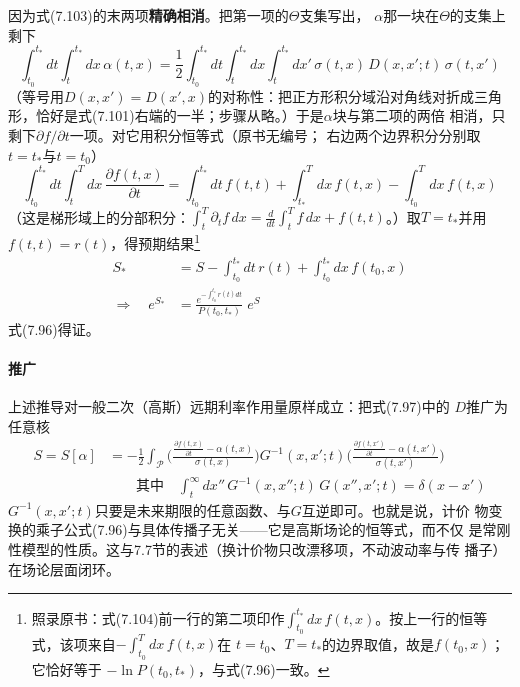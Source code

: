 因为式(7.103)的末两项\textbf{精确相消}。把第一项的$\Theta$支集写出，
$\alpha$那一块在$\Theta$的支集上剩下
\begin{equation*}
\int_{t_{0}}^{t_{*}}dt\int_{t}^{t_{*}}dx\,\alpha(t,x)
=\frac{1}{2}\int_{t_{0}}^{t_{*}}dt\int_{t}^{t_{*}}dx
\int_{t}^{t_{*}}dx'\,\sigma(t,x)\,D(x,x';t)\,\sigma(t,x')
\end{equation*}
（等号用$D(x,x')=D(x',x)$的对称性：把正方形积分域沿对角线对折成三角
形，恰好是式(7.101)右端的一半；步骤从略。）于是$\alpha$块与第二项的两倍
相消，只剩下$\partial f/\partial t$一项。对它用积分恒等式（原书无编号；
右边两个边界积分分别取$t=t_{*}$与$t=t_{0}$）
\begin{equation*}
\int_{t_{0}}^{t_{*}}dt\int_{t}^{T}dx\,\frac{\partial f(t,x)}{\partial t}
=\int_{t_{0}}^{t_{*}}dt\,f(t,t)+\int_{t_{*}}^{T}dx\,f(t,x)
-\int_{t_{0}}^{T}dx\,f(t,x)
\end{equation*}
（这是梯形域上的分部积分：$\int_{t}^{T}\partial_{t}f\,dx=\frac{d}{dt}
\int_{t}^{T}f\,dx+f(t,t)$。）取$T=t_{*}$并用$f(t,t)=r(t)$，得预期结果\footnote{照录原书：式(7.104)前一行的第二项印作$\int_{t_{0}}^{t_{*}}dx\,
f(t,x)$。按上一行的恒等式，该项来自$-\int_{t_{0}}^{T}dx\,f(t,x)$在
$t=t_{0}$、$T=t_{*}$的边界取值，故是$f(t_{0},x)$；它恰好等于
$-\ln P(t_{0},t_{*})$，与式(7.96)一致。}
\begin{align*}
S_{*}&=S-\int_{t_{0}}^{t_{*}}dt\,r(t)+\int_{t_{0}}^{t_{*}}dx\,f(t_{0},x)\\
\Rightarrow\quad e^{S_{*}}&=\frac{e^{-\int_{t_{0}}^{t_{*}}r(t)dt}}
{P(t_{0},t_{*})}\;e^{S}
\tag{7.104}
\end{align*}式(7.96)得证。

\paragraph{推广}
上述推导对一般二次（高斯）远期利率作用量原样成立：把式(7.97)中的
$D$推广为任意核
\begin{align*}
S=S[\alpha]&=-\frac{1}{2}\int_{\mathcal{P}}
\biggl(\frac{\frac{\partial f(t,x)}{\partial t}-\alpha(t,x)}{\sigma(t,x)}
\biggr)G^{-1}(x,x';t)
\biggl(\frac{\frac{\partial f(t,x')}{\partial t}-\alpha(t,x')}{\sigma(t,x')}
\biggr)\\
&\qquad\text{其中}\quad
\int_{t}^{\infty}dx''\,G^{-1}(x,x'';t)\,G(x'',x';t)=\delta(x-x')
\tag{7.105}
\end{align*}
$G^{-1}(x,x';t)$只要是未来期限的任意函数、与$G$互逆即可。也就是说，计价
物变换的乘子公式(7.96)与具体传播子无关——它是高斯场论的恒等式，而不仅
是常刚性模型的性质。这与7.7节的表述（换计价物只改漂移项，不动波动率与传
播子）在场论层面闭环。


